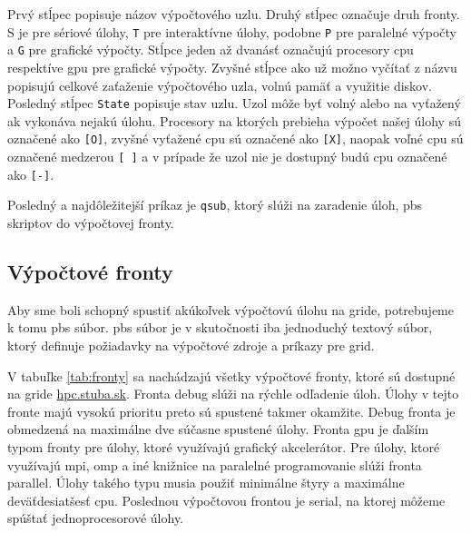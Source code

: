 Prvý stĺpec popisuje názov výpočtového uzlu. Druhý stĺpec označuje druh fronty. S je pre sériové úlohy, \texttt{T} pre interaktívne úlohy,
podobne \texttt{P} pre paralelné výpočty a \texttt{G} pre grafické výpočty.
Stĺpce jeden až dvanásť označujú procesory \acrshort{cpu} respektíve \acrshort{gpu} pre grafické výpočty.
Zvyšné stĺpce ako už možno vyčítať z názvu popisujú celkové zaťaženie výpočtového uzla, volnú pamäť a využitie diskov.
Posledný stĺpec \texttt{State} popisuje stav uzlu. Uzol môže byť volný alebo na vyťažený ak vykonáva nejakú úlohu.
Procesory na ktorých prebieha výpočet našej úlohy sú označené ako \texttt{[O]}, zvyšné vyťažené \acrshort{cpu} sú označené ako \texttt{[X]},
naopak voľné \acrshort{cpu} sú označené medzerou \texttt{[ ]} a v prípade že uzol nie je dostupný budú \acrshort{cpu} označené ako \texttt{[-]}.

Posledný a najdôležitejší príkaz je \texttt{qsub}, ktorý slúži na zaradenie úloh, \acrshort{pbs} skriptov do výpočtovej fronty.

\subsection{Výpočtové fronty}
Aby sme boli schopný spustiť akúkoľvek výpočtovú úlohu na gride, potrebujeme k tomu \acrfull{pbs} súbor.
\acrshort{pbs} súbor je v skutočnosti iba jednoduchý textový súbor, ktorý definuje požiadavky na výpočtové zdroje a príkazy pre grid.

V tabuľke \ref{tab:fronty} sa nachádzajú všetky výpočtové fronty, ktoré sú dostupné na gride \url{hpc.stuba.sk}.
Fronta debug slúži na rýchle odľadenie úloh. Úlohy v tejto fronte majú vysokú prioritu preto sú spustené takmer okamžite.
Debug fronta je obmedzená na maximálne dve súčasne spustené úlohy. Fronta gpu je ďalším typom fronty pre úlohy, ktoré využívajú grafický akcelerátor.
Pre úlohy, ktoré využívajú \acrshort{mpi}, \acrshort{omp} a iné knižnice na paralelné programovanie slúži fronta parallel.
Úlohy takého typu musia použiť minimálne štyry a maximálne deväťdesiatšesť \acrshort{cpu}.
Poslednou výpočtovou frontou je serial, na ktorej môžeme spúštať jednoprocesorové úlohy. 

